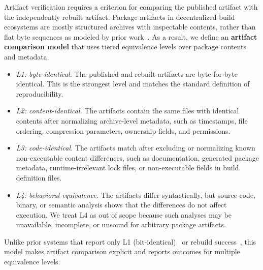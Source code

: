 Artifact verification requires a criterion for comparing the published artifact with the independently rebuilt artifact. 
Package artifacts in decentralized-build ecosystems are mostly structured archives with inspectable contents, rather than flat byte sequences as modeled by prior work~\cite{dietrich_levels_2025}.
As a result, we define an \textbf{artifact comparison model} that uses tiered equivalence levels over package contents and metadata.

\begin{itemize}
\item \textit{L1: byte-identical.} The published and rebuilt artifacts are byte-for-byte identical. This is the strongest level and matches the standard definition of reproducibility.

\item \textit{L2: content-identical.} The artifacts contain the same files with identical contents after normalizing archive-level metadata, such as timestamps, file ordering, compression parameters, ownership fields, and permissions.

\item \textit{L3: code-identical.} The artifacts match after excluding or normalizing known non-executable content differences, such as documentation, generated package metadata, runtime-irrelevant lock files, or non-executable fields in build definition files.

\item \textit{L4: behavioral equivalence.} The artifacts differ syntactically, but source-code, binary, or semantic analysis shows that the differences do not affect execution. We treat L4 as out of scope because such analyses may be unavailable, incomplete, or unsound for arbitrary package artifacts.
\end{itemize}

Unlike prior systems that report only L1 (bit-identical)~\cite{google_oss_rebuild} or rebuild success~\cite{hassanshahiUnlockingReproducibilityAutomating2025}, this model makes artifact comparison explicit and reports outcomes for multiple equivalence levels.
